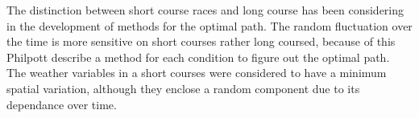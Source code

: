 The distinction between short course races and long course has been considering in the development of methods for the optimal path. The random fluctuation over the time is more sensitive on short courses rather long coursed, because of this Philpott \cite{philpott2001optimising} describe a method for each condition to figure out the optimal path.  The weather variables in a short courses were considered to have a minimum spatial variation, although they enclose a random component due to its dependance over time.\\
